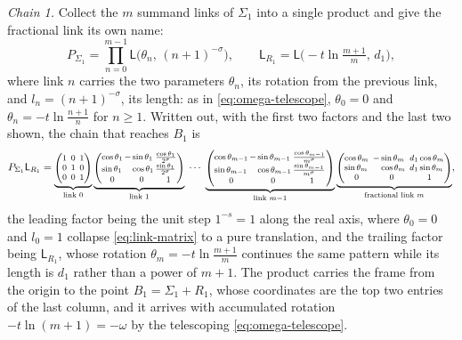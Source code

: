 \documentclass[11pt]{article}
\makeatletter
\theoremstyle{definition}
\newcommand{\linkmatd}[2]{%
\left(\begin{array}{@{}l@{\,}l@{\,}l@{}}
\cos #1 & -\sin #1           & \frac{\cos #1}{#2}\\[1pt]
\sin #1 & \phantom{-}\cos #1 & \frac{\sin #1}{#2}\\[1pt]
\multicolumn{1}{@{}c@{\,}}{0} & \multicolumn{1}{c@{\,}}{0} & \multicolumn{1}{c@{}}{1}
\end{array}\right)}
\newcommand{\linkmat}[2]{%
\left(\begin{array}{@{}l@{\ \,}l@{\ \,}l@{}}
\cos #1 & -\sin #1           & #2\cos #1\\
\sin #1 & \phantom{-}\cos #1 & #2\sin #1\\
\multicolumn{1}{@{}c@{\ \,}}{0} & \multicolumn{1}{c@{\ \,}}{0} & \multicolumn{1}{c@{}}{1}
\end{array}\right)}
\makeatother
\begin{document}
\emph{Chain 1.} Collect the $m$ summand links of $\Sigma_1$ into a single
product and give the fractional link its own name:
\begin{equation}\label{eq:P1-TR1-defs}
P_{\Sigma_1}=\prod_{n=0}^{m-1}\mathsf L\bigl(\theta_n,\,(n+1)^{-\sigma}\bigr),
\qquad
\mathsf L_{R_{1}}=\mathsf L\bigl(-t\ln\tfrac{m+1}{m},\,d_1\bigr),
\end{equation}
where link $n$ carries the two parameters
$\theta_n$, its rotation from the previous link, and
$l_n=(n+1)^{-\sigma}$, its length: as in \eqref{eq:omega-telescope},
$\theta_0=0$ and $\theta_n=-t\ln\tfrac{n+1}{n}$ for $n\ge1$. Written out, with
the first two factors and the last two shown, the chain that
reaches $B_1$ is
\begin{equation}\label{eq:P1-written}
\footnotesize
P_{\Sigma_1}\mathsf L_{R_{1}}=
\underbrace{\left(\begin{array}{@{}c@{\ \,}c@{\ \,}c@{}}
1 & 0 & 1\\
0 & 1 & 0\\
0 & 0 & 1
\end{array}\right)}_{\text{link }0}
\underbrace{\linkmatd{\theta_1}{2^{\sigma}}}_{\text{link }1}\;\cdots\;
\underbrace{\linkmatd{\theta_{m-1}}{m^{\sigma}}}_{\text{link }m-1}
\underbrace{\linkmat{\theta_m}{d_1}}_{\text{fractional link }m},
\end{equation}
the leading factor being the unit step $1^{-s}=1$ along the real axis, where
$\theta_0=0$ and $l_0=1$ collapse \eqref{eq:link-matrix} to a pure translation,
and the trailing factor being $\mathsf L_{R_{1}}$, whose rotation
$\theta_m=-t\ln\tfrac{m+1}{m}$ continues the same pattern while its length is
$d_1$ rather than a power of $m+1$. The product carries the frame from the origin
to the point $B_1=\Sigma_1+R_{1}$, whose coordinates are the top two
entries of the last column, and it arrives with accumulated rotation
$-t\ln(m+1)=-\omega$ by the telescoping \eqref{eq:omega-telescope}.
\end{document}
